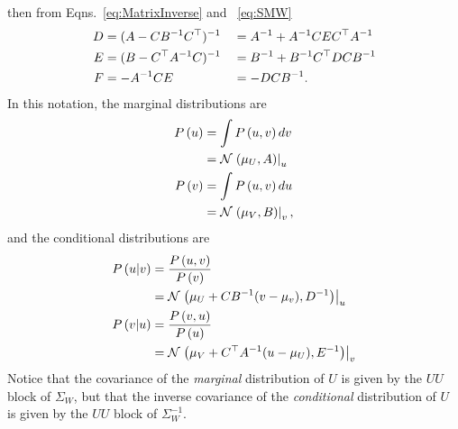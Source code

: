 then from Eqns.~\eqref{eq:MatrixInverse} and ~\eqref{eq:SMW}
\begin{subequations}
  \label{eq:MI:ABCDEF}
  \begin{align}
    \label{eq:MI:D}
    D &= (A - CB^{-1}C^\top)^{-1} & &= A^{-1} + A^{-1}C E
    C^\top A^{-1}\\
    \label{eq:MI:E}
    E &= (B - C^\top A^{-1}C)^{-1} & &= B^{-1} + B^{-1}C^\top
    D C B^{-1} \\
    \label{eq:MI:F}
    F &= -A^{-1}C E & &= -DCB^{-1}.
  \end{align}
\end{subequations}
In this notation, the marginal distributions are
\begin{subequations}
  \label{eq:Gauss-Marginal}
  \begin{align}
    P\left(u \right) &= \int P\left(u,v \right) dv \\
    &= {\mathcal{N}}\left.\left(\mu_U,A\right)\right|_{u} \\
    P\left(v \right) &= \int P\left(u,v \right) du \\
    &= {\mathcal{N}}\left.\left(\mu_V,B\right)\right|_{v},
  \end{align}
\end{subequations}
and the conditional distributions are
\begin{subequations}
  \label{eq:Gauss-Conditional}
  \begin{align}
    P\left(u |v \right) &= \frac{ P\left(u,v \right)}{P\left(v \right)} \\
    &= {\mathcal{N}}\left.\left(\mu_U + CB^{-1}(v-\mu_v),D^{-1}\right)\right|_{u} \\
    P\left(v |u \right) &= \frac{ P\left(v,u \right)}{P\left(u \right)} \\
    &= {\mathcal{N}}\left.\left(\mu_V + C^\top A^{-1} (u - \mu_U),E^{-1}\right)\right|_{v}
  \end{align}
\end{subequations}
Notice that the covariance of the \emph{marginal} distribution of $U$
is given by the $UU$ block of $\Sigma_W$, but that the inverse
covariance of the \emph{conditional} distribution of $U$ is given by
the $UU$ block of $\Sigma_W^{-1}$.


